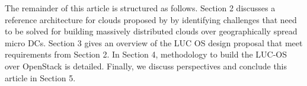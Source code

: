 The remainder of this article is structured as follows. Section 2 discusses a 
reference architecture for clouds proposed by \cite{moreno2012iaas} by 
identifying challenges that need to be solved for building massively distributed 
clouds over geographically spread micro DCs. Section 3 gives an overview of the 
LUC OS design proposal that meet requirements from Section 2. In Section 4, 
methodology to build the LUC-OS over OpenStack is detailed. Finally, we 
discuss perspectives and conclude this article in Section 5.